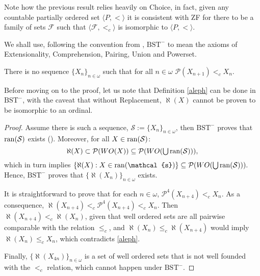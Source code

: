 \documentclass{article}
\begin{document}
Note how the previous result relies heavily on Choice, in fact, given any countable partially ordered set $\langle P,< \rangle$ it is consistent with ZF for there to be a family of sets $\mathcal{F}$ such that $\langle \mathcal{F},<_c\rangle$ is isomorphic to $\langle P,< \rangle$.

We shall use, following the convention from \cite[Def. I.3.1]{Kunen}, $\text{BST}^{-}$ to mean the axioms of Extensionality, Comprehension, Pairing, Union and Powerset.

\begin{theorem}
	There is no sequence $\{X_n\}_{n\in\omega}$ such that for all $n\in\omega$ $\mathcal{P}(X_{n+1}) <_c X_n$.
\end{theorem}

Before moving on to the proof, let us note that Definition \ref{aleph} can be done in $\text{BST}^{-}$, with the caveat that without Replacement, $\aleph(X)$ cannot be proven to be isomorphic to an ordinal.
\begin{proof}
	Assume there is such a sequence, $\mathcal{S} := \{X_n\}_{n\in\omega}$, then $\text{BST}^{-}$ proves that $\operatorname{ran}(\mathcal{S})$ exists (\cite[Def. I.6.6]{Kunen}).
	Moreover, for all $X\in\operatorname{ran}(\mathcal{S})$: 
	\[
		\aleph(X) \subset \mathcal{P}(WO(X)) \subseteq \mathcal{P}(WO(\mathop{\textstyle\bigcup} \operatorname{ran}(\mathcal{S}))),
	\]
	which in turn implies $\{\aleph(X) : X\in\ran(\mathcal{s})\} \subseteq \mathcal{P}({WO(\union \ran(\mathcal{S}))}).$
	Hence, $\text{BST}^{-}$ proves that $\{\aleph(X_n)\}_{n\in\omega}$ exists.
	
	It is straightforward to prove that for each $n\in\omega$, $\mathcal{P}^{4}(X_{n+4}) <_c X_n$. 
	As a consequence, $\aleph(X_{n+4}) <_c \mathcal{P}^{4}(X_{n+4}) <_c X_n$.
	Then $\aleph(X_{n+4}) <_c \aleph(X_n)$, given that well ordered sets are all pairwise comparable with the relation $\leq_c$, and $\aleph(X_n) \leq_c \aleph(X_{n+4})$ would imply $\aleph(X_n) \leq_c X_n$, which contradicts \ref{aleph}.
	
	Finally, $\{\aleph(X_{4n})\}_{n\in\omega}$ is a set of well ordered sets that is not well founded with the $<_c$ relation, which cannot happen under $\text{BST}^{-}$.
\end{proof}






\printindex
\end{document}
